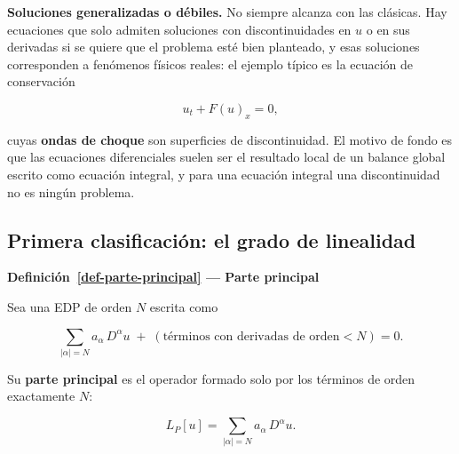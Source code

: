 \documentclass[
  spanish,
  a4paper,
]{scrbook}
\theoremstyle{definition}
\theoremstyle{plain}
\theoremstyle{definition}
\theoremstyle{plain}
\theoremstyle{definition}
\theoremstyle{remark}
\begin{document}
\textbf{Soluciones generalizadas o débiles.} No siempre alcanza con las
clásicas. Hay ecuaciones que solo admiten soluciones con
discontinuidades en \(u\) o en sus derivadas si se quiere que el
problema esté bien planteado, y esas soluciones corresponden a fenómenos
físicos reales: el ejemplo típico es la ecuación de conservación

\[
u_t + F(u)_x = 0 ,
\]

cuyas \textbf{ondas de choque} son superficies de discontinuidad. El
motivo de fondo es que las ecuaciones diferenciales suelen ser el
resultado local de un balance global escrito como ecuación integral, y
para una ecuación integral una discontinuidad no es ningún problema.

\subsection{Primera clasificación: el grado de
linealidad}\label{sec-resumen-2}

\begin{tcolorbox}[enhanced jigsaw, arc=.35mm, bottomrule=.15mm, breakable, colback=white, colframe=quarto-callout-note-color-frame, left=2mm, leftrule=.75mm, opacityback=0, rightrule=.15mm, toprule=.15mm]
\begin{minipage}[t]{5.5mm}
\textcolor{quarto-callout-note-color}{\faInfo}
\end{minipage}%
\begin{minipage}[t]{\textwidth - 5.5mm}

\vspace{-3mm}\textbf{Definición~\ref{def-parte-principal} --- Parte principal}\vspace{3mm}

Sea una EDP de orden \(N\) escrita como

\[
\sum_{|\alpha| = N} a_\alpha\, D^\alpha u \;+\; (\text{términos con derivadas de orden} < N) = 0 .
\]

Su \textbf{parte principal} es el operador formado solo por los términos
de orden exactamente \(N\):

\[
L_P[u] = \sum_{|\alpha| = N} a_\alpha\, D^\alpha u .
\]

\end{minipage}%
\end{tcolorbox}
\end{document}
